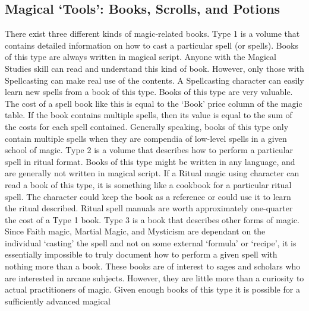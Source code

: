 \documentclass[twoside]{book}
\begin{document}
\subsection{Magical `Tools': Books, Scrolls, and
               Potions}
      There exist three different kinds of magic-related
               books.   Type 1 is a volume that contains detailed
               information on how to cast a particular spell (or spells).
               Books of this type are always written in magical script.
               Anyone with the Magical Studies skill can read and
               understand this kind of book. However, only those with
               Spellcasting can make real use of the contents. A
               Spellcasting character can easily learn new spells from a
               book of this type. Books of this type are very valuable.
               The cost of a spell book like this is equal to the
               `Book' price column of the magic table. If the
               book contains multiple spells, then its value is equal to
               the sum of the costs for each spell contained. Generally
               speaking, books of this type only contain multiple spells
               when they are compendia of low-level spells in a given
               school of magic.   Type 2 is a volume that describes how to perform a
               particular spell in ritual format. Books of this type
               might be written in any language, and are generally not
               written in magical script. If a Ritual magic using
               character can read a book of this type, it is something
               like a cookbook for a particular ritual spell. The
               character could keep the book as a reference or could use
               it to learn the ritual described. Ritual spell manuals are
               worth approximately one-quarter the cost of a Type 1 book.
                 Type 3 is a book that describes other forms of
               magic. Since Faith magic, Martial Magic, and Mysticism are
               dependant on the individual `casting' the
               spell and not on some external `formula' or
               `recipe', it is essentially impossible to
               truly document how to perform a given spell with nothing
               more than a book. These books are of interest to sages and
               scholars who are interested in arcane subjects. However,
               they are little more than a curiosity to actual
               practitioners of magic. Given enough books of this type it
               is possible for a sufficiently advanced magical
\end{document}
